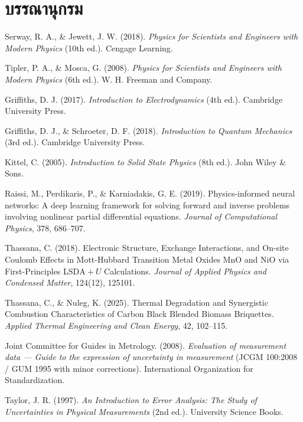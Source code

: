 \chapter*{บรรณานุกรม}

\begin{enumerate}[leftmargin=1.5cm, label={[\arabic*]}, itemsep=8pt]
    \item Serway, R. A., \& Jewett, J. W. (2018). \textit{Physics for Scientists and Engineers with Modern Physics} (10th ed.). Cengage Learning.
    \item Tipler, P. A., \& Mosca, G. (2008). \textit{Physics for Scientists and Engineers with Modern Physics} (6th ed.). W. H. Freeman and Company.
    \item Griffiths, D. J. (2017). \textit{Introduction to Electrodynamics} (4th ed.). Cambridge University Press.
    \item Griffiths, D. J., \& Schroeter, D. F. (2018). \textit{Introduction to Quantum Mechanics} (3rd ed.). Cambridge University Press.
    \item Kittel, C. (2005). \textit{Introduction to Solid State Physics} (8th ed.). John Wiley \& Sons.
    \item Raissi, M., Perdikaris, P., \& Karniadakis, G. E. (2019). Physics-informed neural networks: A deep learning framework for solving forward and inverse problems involving nonlinear partial differential equations. \textit{Journal of Computational Physics}, 378, 686--707.
    \item Thassana, C. (2018). Electronic Structure, Exchange Interactions, and On-site Coulomb Effects in Mott-Hubbard Transition Metal Oxides $\text{MnO}$ and $\text{NiO}$ via First-Principles $\text{LSDA}+U$ Calculations. \textit{Journal of Applied Physics and Condensed Matter}, 124(12), 125101.
    \item Thassana, C., \& Nuleg, K. (2025). Thermal Degradation and Synergistic Combustion Characteristics of Carbon Black Blended Biomass Briquettes. \textit{Applied Thermal Engineering and Clean Energy}, 42, 102--115.
    \item Joint Committee for Guides in Metrology. (2008). \textit{Evaluation of measurement data --- Guide to the expression of uncertainty in measurement} (JCGM 100:2008 / GUM 1995 with minor corrections). International Organization for Standardization.
    \item Taylor, J. R. (1997). \textit{An Introduction to Error Analysis: The Study of Uncertainties in Physical Measurements} (2nd ed.). University Science Books.
\end{enumerate}
